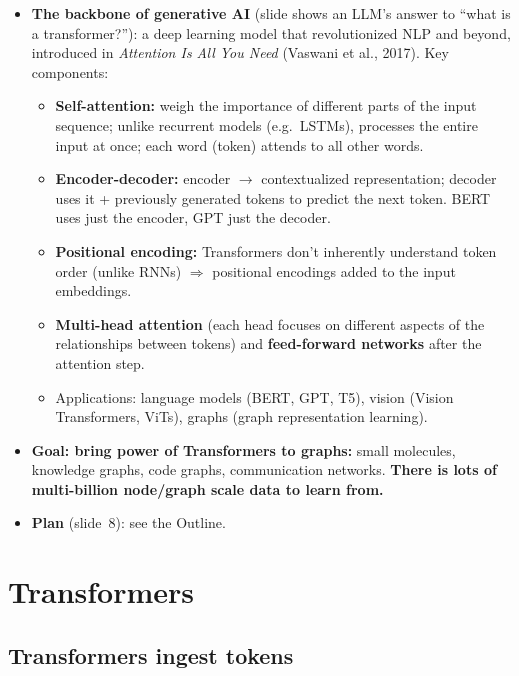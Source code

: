 \begin{itemize}
  \item \textbf{The backbone of generative AI} (slide shows an LLM's answer to
    ``what is a transformer?''): a deep learning model that revolutionized NLP
    and beyond, introduced in \emph{Attention Is All You Need} (Vaswani et al.,
    2017). Key components:
    \begin{itemize}
      \item \textbf{Self-attention:} weigh the importance of different parts of
        the input sequence; unlike recurrent models (e.g.\ LSTMs), processes the
        entire input at once; each word (token) attends to all other words.
      \item \textbf{Encoder-decoder:} encoder $\to$ contextualized
        representation; decoder uses it + previously generated tokens to predict
        the next token. BERT uses just the encoder, GPT just the decoder.
      \item \textbf{Positional encoding:} Transformers don't inherently
        understand token order (unlike RNNs) $\Rightarrow$ positional encodings
        added to the input embeddings.
      \item \textbf{Multi-head attention} (each head focuses on different aspects
        of the relationships between tokens) and \textbf{feed-forward networks}
        after the attention step.
      \item Applications: language models (BERT, GPT, T5), vision (Vision
        Transformers, ViTs), graphs (graph representation learning).
    \end{itemize}
  \item \textbf{Goal: bring power of Transformers to graphs:} small molecules,
    knowledge graphs, code graphs, communication networks. \textbf{There is lots
    of multi-billion node/graph scale data to learn from.}
  \item \textbf{Plan} (slide~8): see the Outline.
\end{itemize}

\section{Transformers}\label{sec:lec08-tf}

\subsection{Transformers ingest tokens}\label{sec:lec08-tokens}

